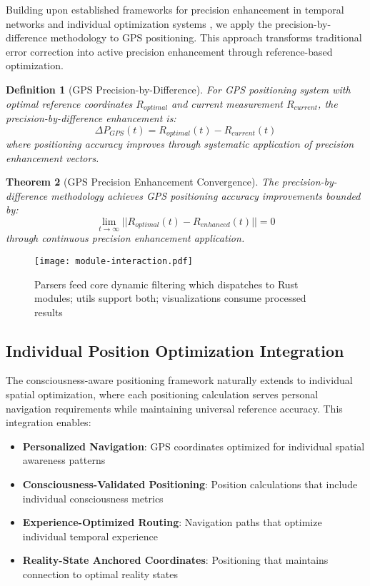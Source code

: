 \documentclass[12pt,a4paper]{article}
\newtheorem{theorem}{Theorem}[section]
\newtheorem{definition}[theorem]{Definition}
\begin{document}
Building upon established frameworks for precision enhancement in temporal networks and individual optimization systems \cite{sachikonye2025individual}, we apply the precision-by-difference methodology to GPS positioning. This approach transforms traditional error correction into active precision enhancement through reference-based optimization.

\begin{definition}[GPS Precision-by-Difference]
For GPS positioning system with optimal reference coordinates $R_{optimal}$ and current measurement $R_{current}$, the precision-by-difference enhancement is:
\begin{equation}
\Delta P_{GPS}(t) = R_{optimal}(t) - R_{current}(t)
\end{equation}
where positioning accuracy improves through systematic application of precision enhancement vectors.
\end{definition}

\begin{theorem}[GPS Precision Enhancement Convergence]
The precision-by-difference methodology achieves GPS positioning accuracy improvements bounded by:
\begin{equation}
\lim_{t \to \infty} ||R_{optimal}(t) - R_{enhanced}(t)|| = 0
\end{equation}
through continuous precision enhancement application.
\end{theorem}

\begin{figure}[H]
\centering
\texttt{[image: module-interaction.pdf]}
\caption{Parsers feed core dynamic filtering which dispatches to Rust modules; utils support both; visualizations consume processed results}
\label{fig:module-interaction}
\end{figure}


\subsection{Individual Position Optimization Integration}

The consciousness-aware positioning framework naturally extends to individual spatial optimization, where each positioning calculation serves personal navigation requirements while maintaining universal reference accuracy. This integration enables:

\begin{itemize}
\item \textbf{Personalized Navigation}: GPS coordinates optimized for individual spatial awareness patterns
\item \textbf{Consciousness-Validated Positioning}: Position calculations that include individual consciousness metrics
\item \textbf{Experience-Optimized Routing}: Navigation paths that optimize individual temporal experience
\item \textbf{Reality-State Anchored Coordinates}: Positioning that maintains connection to optimal reality states
\end{itemize}
\end{document}
